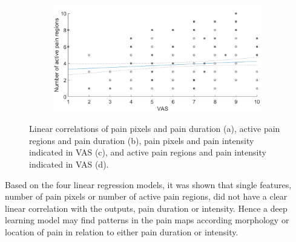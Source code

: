\begin{figure} [t!]
\begin{tcolorbox}[colframe=black!30!black, colback=white]
\begin{subfigure}[b]{0.51\textwidth}
    \caption{}
    \label{fig:3}
  \end{subfigure}
  \hfill
  \hspace{2mm}
  \begin{subfigure}[b]{0.51\textwidth}
    \includegraphics[width=\textwidth]{Figures/vasregion}
       \caption{ }
    \label{fig:4}
  \end{subfigure}  
  \caption{Linear correlations of pain pixels and pain duration (a), active pain regions and pain duration (b), pain pixels and pain intensity indicated in VAS (c), and active pain regions and pain intensity indicated in VAS (d).}
  \label{fig:correlations}
\end{tcolorbox}
\end{figure}

\noindent
Based on the four linear regression models, it was shown that single features, number of pain pixels or number of active pain regions, did not have a clear linear correlation with the outputs, pain duration or intensity. Hence a deep learning model may find patterns in the pain maps according morphology or location of pain in relation to either pain duration or intensity. \newpage

